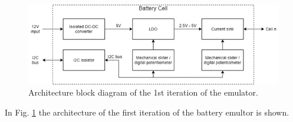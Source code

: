 \begin{figure}[h]
    \begin{center}
        \includegraphics[scale=0.5]{architecture_1st_iteration.png}
    \end{center}
    \caption{Architecture block diagram of the 1st iteration of the emulator.}
    \label{fig:1st_architecture}
\end{figure}

In Fig. \ref{fig:1st_architecture} the architecture of the first iteration 
of the battery emultor is shown.
